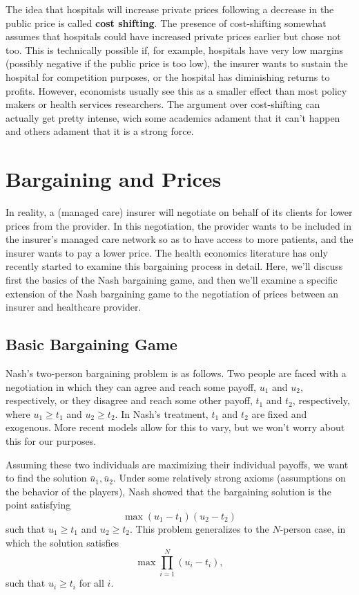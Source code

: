 \documentclass[
  letterpaper,
  DIV=11,
  numbers=noendperiod]{scrreport}
\theoremstyle{definition}
\theoremstyle{remark}
\begin{document}
The idea that hospitals will increase private prices following a
decrease in the public price is called \textbf{cost shifting}. The
presence of cost-shifting somewhat assumes that hospitals could have
increased private prices earlier but chose not too. This is technically
possible if, for example, hospitals have very low margins (possibly
negative if the public price is too low), the insurer wants to sustain
the hospital for competition purposes, or the hospital has diminishing
returns to profits. However, economists usually see this as a smaller
effect than most policy makers or health services researchers. The
argument over cost-shifting can actually get pretty intense, wich some
academics adament that it can't happen and others adament that it is a
strong force.

\hypertarget{bargaining-and-prices}{%
\chapter{Bargaining and Prices}\label{bargaining-and-prices}}

In reality, a (managed care) insurer will negotiate on behalf of its
clients for lower prices from the provider. In this negotiation, the
provider wants to be included in the insurer's managed care network so
as to have access to more patients, and the insurer wants to pay a lower
price. The health economics literature has only recently started to
examine this bargaining process in detail. Here, we'll discuss first the
basics of the Nash bargaining game, and then we'll examine a specific
extension of the Nash bargaining game to the negotiation of prices
between an insurer and healthcare provider.

\hypertarget{basic-bargaining-game}{%
\section{Basic Bargaining Game}\label{basic-bargaining-game}}

Nash's two-person bargaining problem is as follows. Two people are faced
with a negotiation in which they can agree and reach some payoff,
\(u_{1}\) and \(u_{2}\), respectively, or they disagree and reach some
other payoff, \(t_{1}\) and \(t_{2}\), respectively, where
\(u_{1}\geq t_{1}\) and \(u_{2}\geq t_{2}\). In Nash's treatment,
\(t_{1}\) and \(t_{2}\) are fixed and exogenous. More recent models
allow for this to vary, but we won't worry about this for our purposes.

Assuming these two individuals are maximizing their individual payoffs,
we want to find the solution \(\bar{u}_{1}, \bar{u}_{2}\). Under some
relatively strong axioms (assumptions on the behavior of the players),
Nash showed that the bargaining solution is the point satisfying
\[\max (u_{1}-t_{1})(u_{2}-t_{2})\] such that \(u_{1}\geq t_{1}\) and
\(u_{2}\geq t_{2}\). This problem generalizes to the \(N\)-person case,
in which the solution satisfies \[\max \prod_{i=1}^{N} (u_{i}-t_{i}),\]
such that \(u_{i}\geq t_{i}\) for all \(i\).
\end{document}
